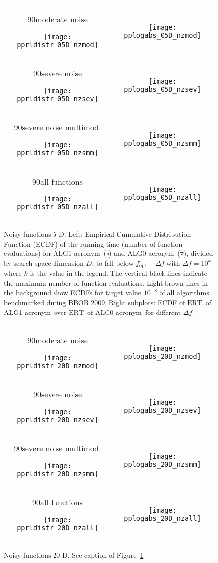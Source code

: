 \documentclass{article}
\newcommand{\ERT}{\ensuremath{\mathrm{ERT}}}
\newcommand{\Df}{\ensuremath{\Delta f}}
\newcommand{\fopt}{\ensuremath{f_\mathrm{opt}}}
\newcommand{\rot}[2][2.5]{
  \hspace*{-3.5\baselineskip}%
  \begin{rotate}{90}\hspace{#1em}#2
  \end{rotate}}
\newcommand{\algorithmA}{ALG0-acronym}  %
\newcommand{\algorithmB}{ALG1-acronym}   %
\begin{document}
\begin{figure}[htbp!]
\centering
\begin{tabular}{@{}c@{}c@{}}
\rot[2.]{moderate noise}
\texttt{[image: pprldistr\_05D\_nzmod]} &
\texttt{[image: pplogabs\_05D\_nzmod]}
\\[-1ex]
\rot[2.8]{severe noise}
\texttt{[image: pprldistr\_05D\_nzsev]} &
\texttt{[image: pplogabs\_05D\_nzsev]}
\\[-1ex]
\rot[0.7]{severe noise multimod.}
\texttt{[image: pprldistr\_05D\_nzsmm]} &
\texttt{[image: pplogabs\_05D\_nzsmm]}\\[-1ex]
\rot[2.8]{all functions}
\texttt{[image: pprldistr\_05D\_nzall]} &
\texttt{[image: pplogabs\_05D\_nzall]}
\end{tabular}
\caption{\label{fig:RLDs05D}Noisy functions 5-D. Left:
Empirical Cumulative Distribution Function (ECDF) of the running time (number
of function evaluations) for \algorithmB\ ($\circ$) and \algorithmA\ ($\triangledown$), divided by
search space dimension $D$, to fall below $\fopt+\Df$ with $\Df = 10^k$ where
$k$ is the value in the legend. The vertical black lines indicate the maximum
number of function evaluations. Light brown lines in the background show ECDFs
for target value $10^{-8}$ of all algorithms benchmarked during BBOB 2009.
Right subplots: ECDF of \ERT\ of \algorithmB\ over \ERT\ of \algorithmA\ for
different $\Df$}
\end{figure}
\begin{figure}[htbp!]
\centering
\begin{tabular}{@{}c@{}c@{}}
\rot[2.]{moderate noise}
\texttt{[image: pprldistr\_20D\_nzmod]} &
\texttt{[image: pplogabs\_20D\_nzmod]}
\\[-1ex]
\rot[2.8]{severe noise}
\texttt{[image: pprldistr\_20D\_nzsev]} &
\texttt{[image: pplogabs\_20D\_nzsev]}
\\[-1ex]
\rot[0.7]{severe noise multimod.}
\texttt{[image: pprldistr\_20D\_nzsmm]} &
\texttt{[image: pplogabs\_20D\_nzsmm]}\\[-1ex]
\rot[2.8]{all functions}
\texttt{[image: pprldistr\_20D\_nzall]} &
\texttt{[image: pplogabs\_20D\_nzall]}
\end{tabular}
\caption{\label{fig:RLDs20D}Noisy functions 20-D. See caption of Figure~\ref{fig:RLDs05D}}
\end{figure}
\end{document}
